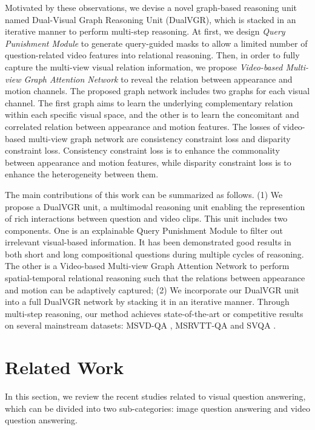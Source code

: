 \documentclass[journal]{IEEEtran}
\begin{document}
Motivated by these observations, we devise a novel graph-based reasoning unit named Dual-Visual Graph Reasoning Unit (DualVGR), which is stacked in an iterative manner to perform multi-step reasoning. At first, we design \textit{Query Punishment Module} to generate query-guided masks to allow a limited number of question-related video features into relational reasoning. Then, in order to fully capture the multi-view visual relation information, we propose \textit{Video-based Multi-view Graph Attention Network} to reveal the relation between appearance and motion channels. The proposed graph network includes two graphs for each visual channel. The first graph aims to learn the underlying complementary relation within each specific visual space, and the other is to learn the concomitant and correlated relation between appearance and motion features. The losses of video-based multi-view graph network are consistency constraint loss and disparity constraint loss. Consistency constraint loss is to enhance the commonality between appearance and motion features, while disparity constraint loss is to enhance the heterogeneity between them.   

The main contributions of this work can be summarized as follows. (1) We propose a DualVGR unit, a multimodal reasoning unit enabling the represention of rich interactions between question and video clips. This unit includes two components. One is an explainable Query Punishment Module to filter out irrelevant visual-based information. It has been demonstrated good results in both short and long compositional questions during multiple cycles of reasoning. The other is a Video-based Multi-view Graph Attention Network to perform spatial-temporal relational reasoning such that the relations between appearance and motion can be adaptively captured; (2) We incorporate our DualVGR unit into a full DualVGR network by stacking it in an iterative manner. Through multi-step reasoning, our method achieves state-of-the-art or competitive results on several mainstream datasets: MSVD-QA \cite{xu2017video}, MSRVTT-QA \cite{xu2016msr} and SVQA \cite{song2018explore}.

















\section{Related Work}
In this section, we review the recent studies related to visual question answering, which can be divided into two sub-categories: image question answering and video question answering.
\end{document}
